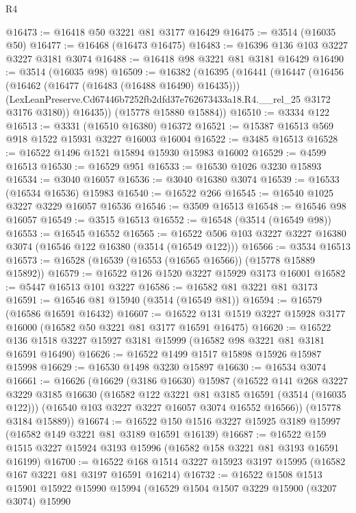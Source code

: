 \begin{lexlean}{R4}
\begin{coremodule}
@16473 := @16418 @50 @3221 @81 @3177 @16429
@16475 := @3514 (@16035 @50)
@16477 := @16468 (@16473 @16475)
@16483 := @16396 @136 @103 @3227 @3227 @3181 @3074
@16488 := @16418 @98 @3221 @81 @3181 @16429
@16490 := @3514 (@16035 @98)
@16509 := @16382
    (@16395
      (@16441
        (@16447
          (@16456
            (@16462 (@16477 (@16483 (@16488 @16490) @16435)))
            (LexLeanPreserve.Cd67446b7252fb2dfd37e762673433a18.R4.__rel_25 @3172 @3176 @3180))
          @16435))
      (@15778 @15880 @15884))
@16510 := @3334 @122
@16513 := @3331 (@16510 @16380) @16372
@16521 := @15387 @16513 @569 @918 @1522 @15931 @3227 @16003 @16004
@16522 := @3485 @16513
@16528 := @16522 @1496 @1521 @15894 @15930 @15983 @16002
@16529 := @4599 @16513
@16530 := @16529 @951
@16533 := @16530 @1026 @3230 @15893
@16534 := @3040 @16057
@16536 := @3040 @16380 @3074
@16539 := @16533 (@16534 @16536) @15983
@16540 := @16522 @266
@16545 := @16540 @1025 @3227 @3229 @16057 @16536
@16546 := @3509 @16513
@16548 := @16546 @98 @16057
@16549 := @3515 @16513
@16552 := @16548 (@3514 (@16549 @98))
@16553 := @16545 @16552
@16565 := @16522 @506 @103 @3227 @3227 @16380 @3074 (@16546 @122 @16380 (@3514 (@16549 @122)))
@16566 := @3534 @16513
@16573 := @16528 (@16539 (@16553 (@16565 @16566)) (@15778 @15889 @15892))
@16579 := @16522 @126 @1520 @3227 @15929 @3173 @16001
@16582 := @5447 @16513 @101 @3227
@16586 := @16582 @81 @3221 @81 @3173
@16591 := @16546 @81 @15940 (@3514 (@16549 @81))
@16594 := @16579 (@16586 @16591 @16432)
@16607 := @16522 @131 @1519 @3227 @15928 @3177 @16000 (@16582 @50 @3221 @81 @3177 @16591 @16475)
@16620 := @16522 @136 @1518 @3227 @15927 @3181 @15999 (@16582 @98 @3221 @81 @3181 @16591 @16490)
@16626 := @16522 @1499 @1517 @15898 @15926 @15987 @15998
@16629 := @16530 @1498 @3230 @15897
@16630 := @16534 @3074
@16661 := @16626
    (@16629
      (@3186 @16630)
      @15987
      (@16522
        @141
        @268
        @3227
        @3229
        @3185
        @16630
        (@16582 @122 @3221 @81 @3185 @16591 (@3514 (@16035 @122)))
        (@16540 @103 @3227 @3227 @16057 @3074 @16552 @16566))
      (@15778 @3184 @15889))
@16674 := @16522 @150 @1516 @3227 @15925 @3189 @15997 (@16582 @149 @3221 @81 @3189 @16591 @16139)
@16687 := @16522 @159 @1515 @3227 @15924 @3193 @15996 (@16582 @158 @3221 @81 @3193 @16591 @16199)
@16700 := @16522 @168 @1514 @3227 @15923 @3197 @15995 (@16582 @167 @3221 @81 @3197 @16591 @16214)
@16732 := @16522
    @1508
    @1513
    @15901
    @15922
    @15990
    @15994
    (@16529
      @1504
      @1507
      @3229
      @15900
      (@3207 @3074)
      @15990

\end{coremodule}
\end{lexlean}
